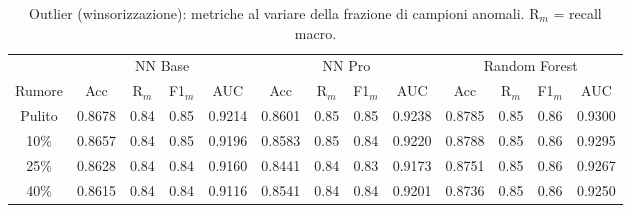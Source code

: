 \begin{table}[H]\centering\footnotesize
\setlength{\tabcolsep}{4pt}
\caption{Outlier (winsorizzazione): metriche al variare della frazione di campioni anomali. R$_m$ = recall macro.}\label{tab:out}
\begin{tabular}{c *{12}{c}}
\toprule
 & \multicolumn{4}{c}{NN Base} & \multicolumn{4}{c}{NN Pro} & \multicolumn{4}{c}{Random Forest}\\
\cmidrule(lr){2-5}\cmidrule(lr){6-9}\cmidrule(lr){10-13}
Rumore & Acc & R$_m$ & F1$_m$ & AUC & Acc & R$_m$ & F1$_m$ & AUC & Acc & R$_m$ & F1$_m$ & AUC \\
\midrule
Pulito & 0.8678 & 0.84 & 0.85 & 0.9214 & 0.8601 & 0.85 & 0.85 & 0.9238 & 0.8785 & 0.85 & 0.86 & 0.9300 \\
10\% & 0.8657 & 0.84 & 0.85 & 0.9196 & 0.8583 & 0.85 & 0.84 & 0.9220 & 0.8788 & 0.85 & 0.86 & 0.9295 \\
25\% & 0.8628 & 0.84 & 0.84 & 0.9160 & 0.8441 & 0.84 & 0.83 & 0.9173 & 0.8751 & 0.85 & 0.86 & 0.9267 \\
40\% & 0.8615 & 0.84 & 0.84 & 0.9116 & 0.8541 & 0.84 & 0.84 & 0.9201 & 0.8736 & 0.85 & 0.86 & 0.9250 \\
\bottomrule
\end{tabular}
\end{table}
